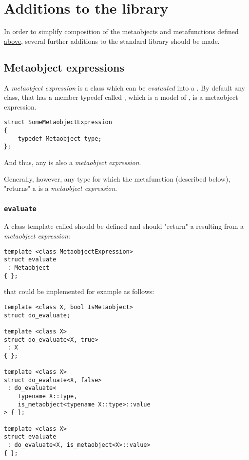 \section{Additions to the library}
\label{section-Library}

In order to simplify composition of the metaobjects and metafunctions defined
\hyperref[section-Concepts]{above}, several further additions to the standard
library should be made.

\subsection{Metaobject expressions}

A {\em metaobject expression} is a class which can be {\em evaluated}
into a . By default any class, that has a member typedef
called \verb@type@, which is a model of , is a metaobject expression.

\begin{verbatim}
struct SomeMetaobjectExpression
{
	typedef Metaobject type;
};

\end{verbatim}

And thus, any  is also a {\em metaobject expression}.

Generally, however, any type for which the \verb@evaluate@ metafunction
(described below), "returns" a  is a {\em metaobject expression}.

\subsubsection{\texttt{evaluate}}

A class template called \verb@evaluate@ should be defined and should "return" a 
resulting from a {\em metaobject expression}:

\begin{verbatim}
template <class MetaobjectExpression>
struct evaluate
 : Metaobject
{ };
\end{verbatim}

that could be implemented for example as follows:

\begin{verbatim}
template <class X, bool IsMetaobject>
struct do_evaluate;

template <class X>
struct do_evaluate<X, true>
 : X
{ };

template <class X>
struct do_evaluate<X, false>
 : do_evaluate<
	typename X::type,
	is_metaobject<typename X::type>::value
> { };

template <class X>
struct evaluate
 : do_evaluate<X, is_metaobject<X>::value>
{ };

\end{verbatim}

